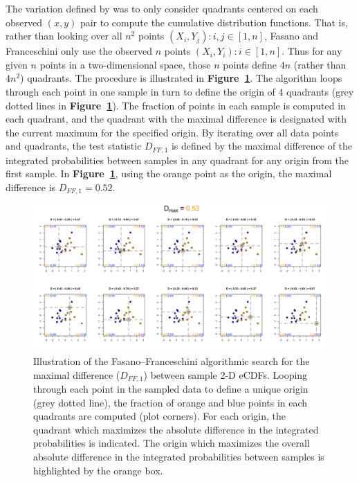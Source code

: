 \documentclass[codesnippet]{jss}
\begin{document}
The variation defined by \cite{Fasano1987}  was to only consider
quadrants centered on each observed $(x, y)$ pair to compute the
cumulative distribution functions. That is, rather than looking over all $n^2$ points
${(X_i, Y_j): i,j \in [1,n]}$, Fasano and Franceschini only use the observed $n$ points
${(X_i, Y_i): i \in [1,n]}$.
Thus for any given $n$ points in a two-dimensional space, those $n$ points define $4n$ (rather than
$4n^2$) quadrants.  The procedure is illustrated in \textbf{Figure~\ref{fig:kstest2D}}.
The algorithm loops through each point in one sample in turn to define
the origin of 4 quadrants (grey dotted lines in
\textbf{Figure~\ref{fig:kstest2D}}). The fraction of points in each
sample is computed in each quadrant, and the quadrant with the maximal
difference is designated with the current maximum for the specified
origin. By iterating over all data points and quadrants, the test
statistic $D_{FF,1}$ is defined by the maximal difference of the
integrated probabilities between samples in any quadrant for any
origin from the first sample.  In \textbf{Figure~\ref{fig:kstest2D}},
using the orange point as the origin, the maximal difference is
$D_{FF,1} = 0.52$.

\begin{figure}[t!]
\centering
\includegraphics{fftestOutput}
\caption{\label{fig:kstest2D} Illustration of the Fasano--Franceschini algorithmic search for the maximal difference ($D_{FF,1}$) between sample 2-D eCDFs. Looping through each point in the sampled data to define a unique origin (grey dotted line), the fraction of orange and blue points in each quadrants are computed (plot corners). For each origin, the quadrant which maximizes the absolute difference in the integrated probabilities is indicated. The origin which maximizes the overall absolute difference in the integrated probabilities between samples is highlighted by the orange box.
}
\end{figure}
\end{document}
